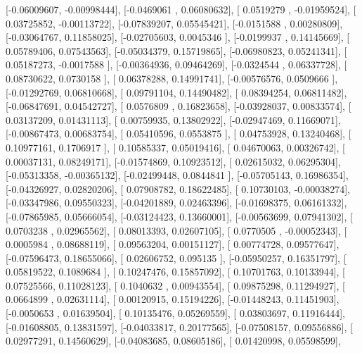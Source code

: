 \documentclass{article}
\begin{document}
       [-0.06009607, -0.00998444],
       [-0.0469061 ,  0.06080632],
       [ 0.0519279 , -0.01959524],
       [ 0.03725852, -0.00113722],
       [-0.07839207,  0.05545421],
       [-0.0151588 ,  0.00280809],
       [-0.03064767,  0.11858025],
       [-0.02705603,  0.0045346 ],
       [-0.0199937 ,  0.14145669],
       [ 0.05789406,  0.07543563],
       [-0.05034379,  0.15719865],
       [-0.06980823,  0.05241341],
       [ 0.05187273, -0.0017588 ],
       [-0.00364936,  0.09464269],
       [-0.0324544 ,  0.06337728],
       [ 0.08730622,  0.0730158 ],
       [ 0.06378288,  0.14991741],
       [-0.00576576,  0.0509666 ],
       [-0.01292769,  0.06810668],
       [ 0.09791104,  0.14490482],
       [ 0.08394254,  0.06811482],
       [-0.06847691,  0.04542727],
       [ 0.0576809 ,  0.16823658],
       [-0.03928037,  0.00833574],
       [ 0.03137209,  0.01431113],
       [ 0.00759935,  0.13802922],
       [-0.02947469,  0.11669071],
       [-0.00867473,  0.00683754],
       [ 0.05410596,  0.0553875 ],
       [ 0.04753928,  0.13240468],
       [ 0.10977161,  0.1706917 ],
       [ 0.10585337,  0.05019416],
       [ 0.04670063,  0.00326742],
       [ 0.00037131,  0.08249171],
       [-0.01574869,  0.10923512],
       [ 0.02615032,  0.06295304],
       [-0.05313358, -0.00365132],
       [-0.02499448,  0.0844841 ],
       [-0.05705143,  0.16986354],
       [-0.04326927,  0.02820206],
       [ 0.07908782,  0.18622485],
       [ 0.10730103, -0.00038274],
       [-0.03347986,  0.09550323],
       [-0.04201889,  0.02463396],
       [-0.01698375,  0.06161332],
       [-0.07865985,  0.05666054],
       [-0.03124423,  0.13660001],
       [-0.00563699,  0.07941302],
       [ 0.0703238 ,  0.02965562],
       [ 0.08013393,  0.02607105],
       [ 0.0770505 , -0.00052343],
       [ 0.0005984 ,  0.08688119],
       [ 0.09563204,  0.00151127],
       [ 0.00774728,  0.09577647],
       [-0.07596473,  0.18655066],
       [ 0.02606752,  0.095135  ],
       [-0.05950257,  0.16351797],
       [ 0.05819522,  0.1089684 ],
       [ 0.10247476,  0.15857092],
       [ 0.10701763,  0.10133944],
       [ 0.07525566,  0.11028123],
       [ 0.1040632 ,  0.00943554],
       [ 0.09875298,  0.11294927],
       [ 0.0664899 ,  0.02631114],
       [ 0.00120915,  0.15194226],
       [-0.01448243,  0.11451903],
       [-0.0050653 ,  0.01639504],
       [ 0.10135476,  0.05269559],
       [ 0.03803697,  0.11916444],
       [-0.01608805,  0.13831597],
       [-0.04033817,  0.20177565],
       [-0.07508157,  0.09556886],
       [ 0.02977291,  0.14560629],
       [-0.04083685,  0.08605186],
       [ 0.01420998,  0.05598599],
\end{document}
